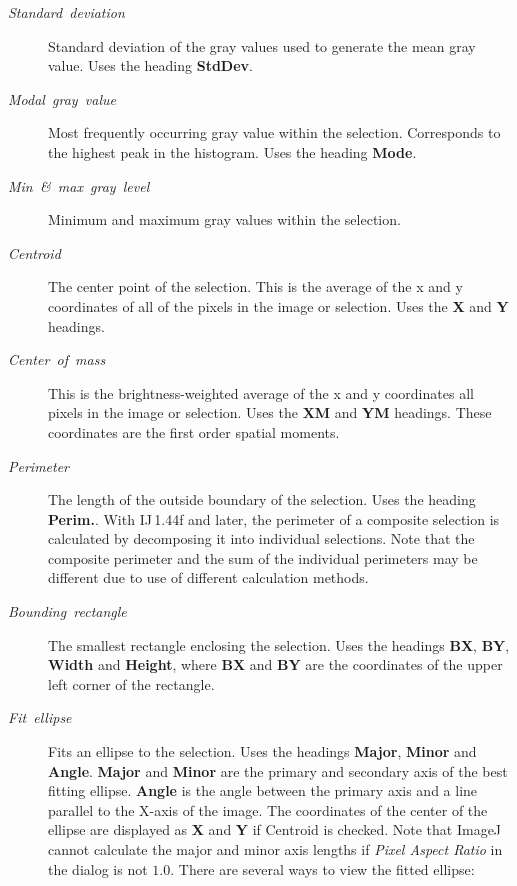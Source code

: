 \begin{description}
\item [{\emph{Standard\ deviation}}] Standard deviation of the gray values
used to generate the mean gray value. Uses the 
heading \textbf{StdDev}.
\item [{\emph{Modal\ gray\ value}}] Most frequently occurring gray value
within the selection. Corresponds to the highest peak in the histogram.
Uses the heading \textbf{Mode}.
\item [{\emph{Min\ \&\ max\ gray\ level}}] Minimum and maximum gray
values within the selection.
\item [{\emph{Centroid}}] The center point of the selection. This is the
average of the x and y coordinates of all of the pixels in the image
or selection. Uses the \textbf{X} and \textbf{Y} headings.
\item [{\emph{Center\ of\ mass}}] This is the brightness-weighted average
of the x and y coordinates all pixels in the image or selection. Uses
the \textbf{XM} and \textbf{YM} headings. These coordinates are the
first order spatial moments.
\item [{\emph{Perimeter}}] The length of the outside boundary of the selection.
Uses the heading \textbf{Perim.}. With IJ\,1.44f
and later, the perimeter of a composite selection is calculated by
decomposing it into individual selections. Note that the composite
perimeter and the sum of the individual perimeters may be different
due to use of different calculation methods. 
\item [{\emph{Bounding\ rectangle}}] The smallest rectangle enclosing
the selection. Uses the headings \textbf{BX}, \textbf{BY}, \textbf{Width}
and \textbf{Height}, where \textbf{BX} and \textbf{BY} are the coordinates
of the upper left corner of the rectangle.
\item [{\emph{Fit\ ellipse}}] Fits an ellipse to the
selection. Uses the headings \textbf{Major}, \textbf{Minor} and \textbf{Angle}.
\textbf{Major} and \textbf{Minor} are the primary and secondary axis
of the best fitting ellipse. \textbf{Angle} is the angle between the
primary axis and a line parallel to the X-axis of the image. The coordinates
of the center of the ellipse are displayed as \textbf{X} and \textbf{Y}
if Centroid is checked. Note that ImageJ cannot calculate the major
and minor axis lengths if \emph{Pixel Aspect Ratio} in the 
dialog is not $1.0$. There are several ways to view the fitted ellipse:


\end{description}
